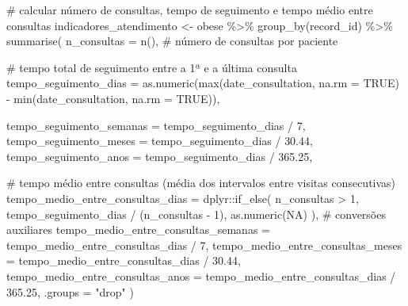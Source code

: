 \documentclass[
]{article}
\newenvironment{Shaded}{\begin{snugshade}}{\end{snugshade}}
\newcommand{\AttributeTok}[1]{\textcolor[rgb]{0.40,0.45,0.13}{#1}}
\newcommand{\CommentTok}[1]{\textcolor[rgb]{0.37,0.37,0.37}{#1}}
\newcommand{\ConstantTok}[1]{\textcolor[rgb]{0.56,0.35,0.01}{#1}}
\newcommand{\DecValTok}[1]{\textcolor[rgb]{0.68,0.00,0.00}{#1}}
\newcommand{\FloatTok}[1]{\textcolor[rgb]{0.68,0.00,0.00}{#1}}
\newcommand{\FunctionTok}[1]{\textcolor[rgb]{0.28,0.35,0.67}{#1}}
\newcommand{\NormalTok}[1]{\textcolor[rgb]{0.00,0.23,0.31}{#1}}
\newcommand{\OtherTok}[1]{\textcolor[rgb]{0.00,0.23,0.31}{#1}}
\newcommand{\SpecialCharTok}[1]{\textcolor[rgb]{0.37,0.37,0.37}{#1}}
\newcommand{\StringTok}[1]{\textcolor[rgb]{0.13,0.47,0.30}{#1}}
\begin{document}
\begin{Shaded}
\begin{Highlighting}[]
\CommentTok{\# calcular número de consultas, tempo de seguimento e tempo médio entre consultas}
\NormalTok{indicadores\_atendimento }\OtherTok{\textless{}{-}}\NormalTok{ obese }\SpecialCharTok{\%\textgreater{}\%}
  \FunctionTok{group\_by}\NormalTok{(record\_id) }\SpecialCharTok{\%\textgreater{}\%}
  \FunctionTok{summarise}\NormalTok{(}
    \AttributeTok{n\_consultas =} \FunctionTok{n}\NormalTok{(), }\CommentTok{\# número de consultas por paciente}
    
    \CommentTok{\# tempo total de seguimento entre a 1ª e a última consulta}
    \AttributeTok{tempo\_seguimento\_dias =} \FunctionTok{as.numeric}\NormalTok{(}\FunctionTok{max}\NormalTok{(date\_consultation, }\AttributeTok{na.rm =} \ConstantTok{TRUE}\NormalTok{) }\SpecialCharTok{{-}}
                                       \FunctionTok{min}\NormalTok{(date\_consultation, }\AttributeTok{na.rm =} \ConstantTok{TRUE}\NormalTok{)),}
    
    \AttributeTok{tempo\_seguimento\_semanas =}\NormalTok{ tempo\_seguimento\_dias }\SpecialCharTok{/} \DecValTok{7}\NormalTok{,}
    \AttributeTok{tempo\_seguimento\_meses  =}\NormalTok{ tempo\_seguimento\_dias }\SpecialCharTok{/} \FloatTok{30.44}\NormalTok{,}
    \AttributeTok{tempo\_seguimento\_anos   =}\NormalTok{ tempo\_seguimento\_dias }\SpecialCharTok{/} \FloatTok{365.25}\NormalTok{,}
    
    \CommentTok{\# tempo médio entre consultas (média dos intervalos entre visitas consecutivas)}
    \AttributeTok{tempo\_medio\_entre\_consultas\_dias =}\NormalTok{ dplyr}\SpecialCharTok{::}\FunctionTok{if\_else}\NormalTok{(}
\NormalTok{      n\_consultas }\SpecialCharTok{\textgreater{}} \DecValTok{1}\NormalTok{,}
\NormalTok{      tempo\_seguimento\_dias }\SpecialCharTok{/}\NormalTok{ (n\_consultas }\SpecialCharTok{{-}} \DecValTok{1}\NormalTok{),}
      \FunctionTok{as.numeric}\NormalTok{(}\ConstantTok{NA}\NormalTok{)}
\NormalTok{    ),}
    \CommentTok{\# conversões auxiliares}
    \AttributeTok{tempo\_medio\_entre\_consultas\_semanas =}\NormalTok{ tempo\_medio\_entre\_consultas\_dias }\SpecialCharTok{/} \DecValTok{7}\NormalTok{,}
    \AttributeTok{tempo\_medio\_entre\_consultas\_meses   =}\NormalTok{ tempo\_medio\_entre\_consultas\_dias }\SpecialCharTok{/} \FloatTok{30.44}\NormalTok{,}
    \AttributeTok{tempo\_medio\_entre\_consultas\_anos    =}\NormalTok{ tempo\_medio\_entre\_consultas\_dias }\SpecialCharTok{/} \FloatTok{365.25}\NormalTok{,}
    \AttributeTok{.groups =} \StringTok{"drop"}
\NormalTok{  )}
\end{Highlighting}
\end{Shaded}
\end{document}
